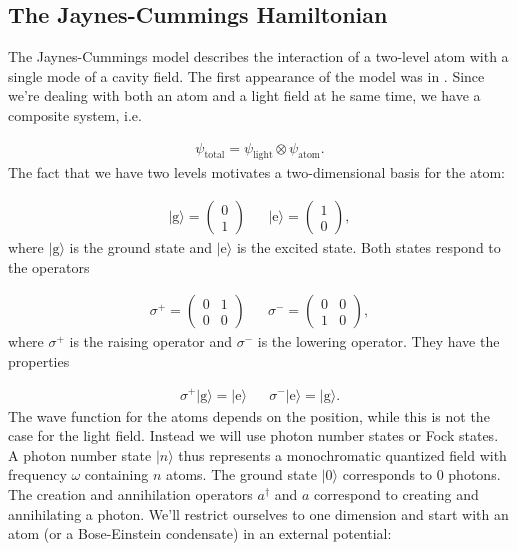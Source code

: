 \subsection{The Jaynes-Cummings Hamiltonian}
The Jaynes-Cummings model describes the interaction of a two-level atom with a single mode of a cavity field. The first appearance of the model was in \cite{jaynes}. Since we're dealing with both an atom and a light field at he same time, we have a composite system, i.e.

\begin{align}
\psi_\text{total} = \psi_\text{light} \otimes \psi_\text{atom}.
\end{align}The fact that we have two levels motivates a two-dimensional basis for the atom:

\begin{align}
|\text{g}\rangle = \begin{pmatrix}0 \\ 1\end{pmatrix} && |\text{e}\rangle = \begin{pmatrix}1 \\ 0\end{pmatrix},
\end{align}where $|\text{g}\rangle$ is the ground state and $|\text{e}\rangle$ is the excited state. Both states respond to the operators

\begin{align}
\sigma^+ = \begin{pmatrix}0 & 1 \\ 0 & 0\end{pmatrix} && \sigma^- = \begin{pmatrix}0 & 0 \\ 1 & 0\end{pmatrix},
\end{align}where $\sigma^+$ is the raising operator and $\sigma^-$ is the lowering operator. They have the properties

\begin{align}
\sigma^+ |\text{g}\rangle = |\text{e}\rangle && \sigma^- |\text{e}\rangle = |\text{g}\rangle.
\end{align}The wave function for the atoms depends on the position, while this is not the case for the light field. Instead we will use photon number states or Fock states. A photon number state $|n\rangle$ thus represents a monochromatic quantized field with frequency $\omega$ containing $n$ atoms. The ground state $|0\rangle$ corresponds to 0 photons. The creation and  annihilation operators $a^\dagger$ and $a$ correspond to creating and annihilating a photon. We'll restrict ourselves to one dimension and start with an atom (or a Bose-Einstein condensate) in an external potential:

